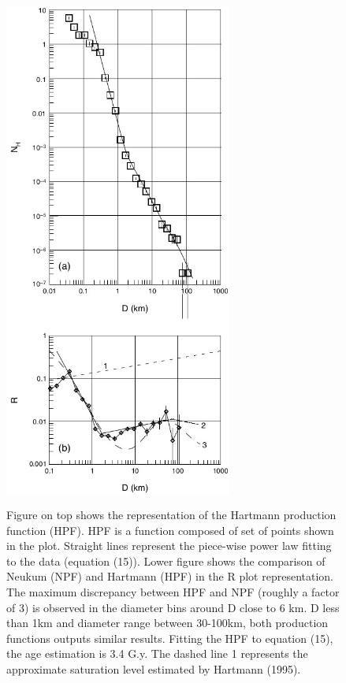\documentclass[11pt]{article}
\begin{document}
\begin{figure}[H]
	\centering
	\includegraphics[width=75mm,height=170mm,  scale=0.8]{files/lunar_functions/HPF.jpg}
	\caption{Figure on top shows the representation of the Hartmann production function (HPF). HPF is a function composed of set of
		points shown in the plot. Straight lines represent the piece-wise
		power law fitting to the data (equation (15)). Lower figure shows the comparison of Neukum (NPF) and Hartmann (HPF)
		in the R plot representation. The maximum discrepancy between
		HPF and NPF (roughly a factor of 3) is observed in the
		diameter bins around D close to 6 km. D less than 1km and diameter range between 30-100km, both production functions outputs similar results. Fitting the HPF to equation (15), the age estimation is 3.4 G.y. The dashed line 1 represents the approximate saturation level estimated by Hartmann (1995).}
	\label{HPF}
\end{figure}
\end{document}
